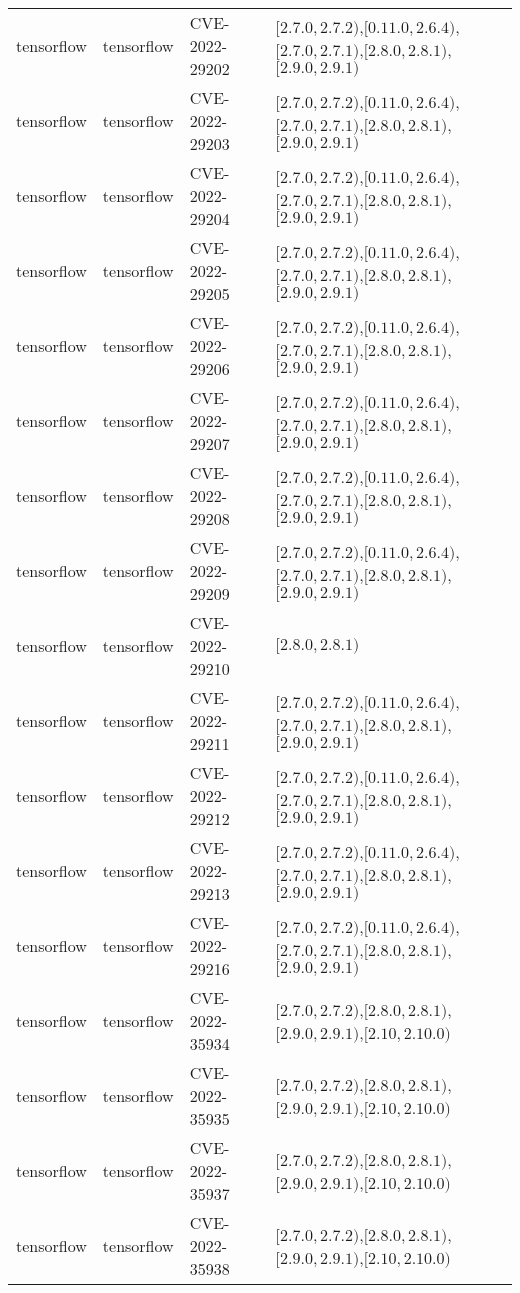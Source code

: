 \begin{tabular}{llll}
tensorflow & tensorflow & CVE-2022-29202 & $[2.7.0,2.7.2)$,$[0.11.0,2.6.4)$,$[2.7.0,2.7.1)$,$[2.8.0,2.8.1)$,$[2.9.0,2.9.1)$ \\
tensorflow & tensorflow & CVE-2022-29203 & $[2.7.0,2.7.2)$,$[0.11.0,2.6.4)$,$[2.7.0,2.7.1)$,$[2.8.0,2.8.1)$,$[2.9.0,2.9.1)$ \\
tensorflow & tensorflow & CVE-2022-29204 & $[2.7.0,2.7.2)$,$[0.11.0,2.6.4)$,$[2.7.0,2.7.1)$,$[2.8.0,2.8.1)$,$[2.9.0,2.9.1)$ \\
tensorflow & tensorflow & CVE-2022-29205 & $[2.7.0,2.7.2)$,$[0.11.0,2.6.4)$,$[2.7.0,2.7.1)$,$[2.8.0,2.8.1)$,$[2.9.0,2.9.1)$ \\
tensorflow & tensorflow & CVE-2022-29206 & $[2.7.0,2.7.2)$,$[0.11.0,2.6.4)$,$[2.7.0,2.7.1)$,$[2.8.0,2.8.1)$,$[2.9.0,2.9.1)$ \\
tensorflow & tensorflow & CVE-2022-29207 & $[2.7.0,2.7.2)$,$[0.11.0,2.6.4)$,$[2.7.0,2.7.1)$,$[2.8.0,2.8.1)$,$[2.9.0,2.9.1)$ \\
tensorflow & tensorflow & CVE-2022-29208 & $[2.7.0,2.7.2)$,$[0.11.0,2.6.4)$,$[2.7.0,2.7.1)$,$[2.8.0,2.8.1)$,$[2.9.0,2.9.1)$ \\
tensorflow & tensorflow & CVE-2022-29209 & $[2.7.0,2.7.2)$,$[0.11.0,2.6.4)$,$[2.7.0,2.7.1)$,$[2.8.0,2.8.1)$,$[2.9.0,2.9.1)$ \\
tensorflow & tensorflow & CVE-2022-29210 & $[2.8.0,2.8.1)$ \\
tensorflow & tensorflow & CVE-2022-29211 & $[2.7.0,2.7.2)$,$[0.11.0,2.6.4)$,$[2.7.0,2.7.1)$,$[2.8.0,2.8.1)$,$[2.9.0,2.9.1)$ \\
tensorflow & tensorflow & CVE-2022-29212 & $[2.7.0,2.7.2)$,$[0.11.0,2.6.4)$,$[2.7.0,2.7.1)$,$[2.8.0,2.8.1)$,$[2.9.0,2.9.1)$ \\
tensorflow & tensorflow & CVE-2022-29213 & $[2.7.0,2.7.2)$,$[0.11.0,2.6.4)$,$[2.7.0,2.7.1)$,$[2.8.0,2.8.1)$,$[2.9.0,2.9.1)$ \\
tensorflow & tensorflow & CVE-2022-29216 & $[2.7.0,2.7.2)$,$[0.11.0,2.6.4)$,$[2.7.0,2.7.1)$,$[2.8.0,2.8.1)$,$[2.9.0,2.9.1)$ \\
tensorflow & tensorflow & CVE-2022-35934 & $[2.7.0,2.7.2)$,$[2.8.0,2.8.1)$,$[2.9.0,2.9.1)$,$[2.10,2.10.0)$ \\
tensorflow & tensorflow & CVE-2022-35935 & $[2.7.0,2.7.2)$,$[2.8.0,2.8.1)$,$[2.9.0,2.9.1)$,$[2.10,2.10.0)$ \\
tensorflow & tensorflow & CVE-2022-35937 & $[2.7.0,2.7.2)$,$[2.8.0,2.8.1)$,$[2.9.0,2.9.1)$,$[2.10,2.10.0)$ \\
tensorflow & tensorflow & CVE-2022-35938 & $[2.7.0,2.7.2)$,$[2.8.0,2.8.1)$,$[2.9.0,2.9.1)$,$[2.10,2.10.0)$ \\

\end{tabular}
